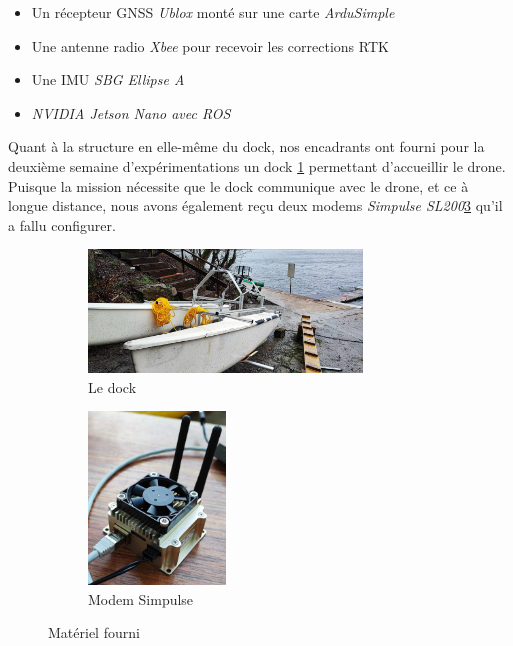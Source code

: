 \documentclass[12pt]{report}
\begin{document}
\begin{itemize}
    \item Un récepteur GNSS \textit{Ublox} monté sur une carte \textit{ArduSimple}
    \item Une antenne radio \textit{Xbee} pour recevoir les corrections RTK
    \item Une IMU \textit{SBG Ellipse A}
    \item \textit{NVIDIA Jetson Nano avec ROS}
\end{itemize}

Quant à la structure en elle-même du dock, nos encadrants ont fourni pour la deuxième semaine d'expérimentations un dock \ref{fig:dock} permettant d'accueillir le drone.
Puisque la mission nécessite que le dock communique avec le drone, et ce à longue distance, nous avons également reçu deux modems \textit{Simpulse SL200}\ref{fig:simpulse} qu'il a fallu configurer.

\begin{figure}[H]
    \begin{subfigure}{0.45\textwidth}
        \centering
        \includegraphics[width=0.8\textwidth]{imgs/dock.jpg}
        \caption{Le dock}
        \label{fig:dock}
    \end{subfigure}
    \begin{subfigure}{0.4\textwidth}
        \centering
        \includegraphics[width=0.4\textwidth]{imgs/simpulse.jpg}
        \caption{Modem Simpulse}
        \label{fig:simpulse}
    \end{subfigure}
    \caption{Matériel fourni}
\end{figure}
\end{document}
